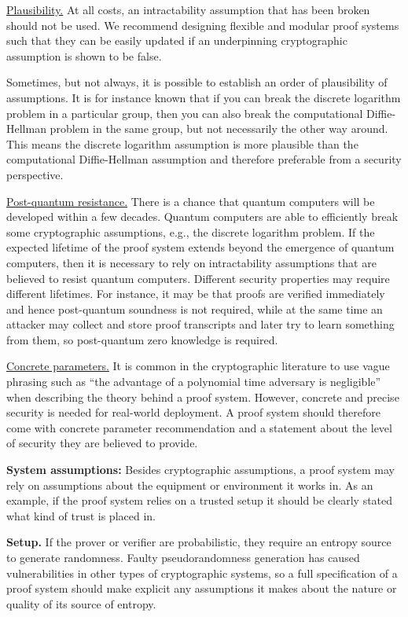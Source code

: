 \underline{Plausibility.} At all costs, an intractability assumption that has been broken should not be used. We recommend designing flexible and modular proof systems such that they can be easily updated if an underpinning cryptographic assumption is shown to be false. 

Sometimes, but not always, it is possible to establish an order of plausibility of assumptions. It is for instance known that if you can break the discrete logarithm problem in a particular group, then you can also break the computational Diffie-Hellman problem in the same group, but not necessarily the other way around. This means the discrete logarithm assumption is more plausible than the computational Diffie-Hellman assumption and therefore preferable from a security perspective.
 
\underline{Post-quantum resistance.} There is a chance that quantum computers will be developed within a few decades. Quantum computers are able to efficiently break some cryptographic assumptions, e.g., the discrete logarithm problem. If the expected lifetime of the proof system extends beyond the emergence of quantum computers, then it is necessary to rely on intractability assumptions that are believed to resist quantum computers.    	
Different security properties may require different lifetimes. For instance, it may be that proofs are verified immediately and hence post-quantum soundness is not required, while at the same time an attacker may collect and store proof transcripts and later try to learn something from them, so post-quantum zero knowledge is required.
 
\underline{Concrete parameters.} It is common in the cryptographic literature to use vague phrasing such as “the advantage of a polynomial time adversary is negligible” when describing the theory behind a proof system. However, concrete and precise security is needed for real-world deployment. A proof system should therefore come with concrete parameter recommendation and a statement about the level of security they are believed to provide.  
 
\textbf{System assumptions:} Besides cryptographic assumptions, a proof system may rely on assumptions about the equipment or environment it works in.
As an example, if the proof system relies on a trusted setup it should be clearly stated what kind of trust is placed in.

\textbf{Setup.} If the prover or verifier are probabilistic, they require an entropy source to generate randomness. 
Faulty pseudorandomness generation has caused vulnerabilities in other types of cryptographic systems, so a full specification of a proof system should make explicit any assumptions it makes about the nature or quality of its source of entropy.

